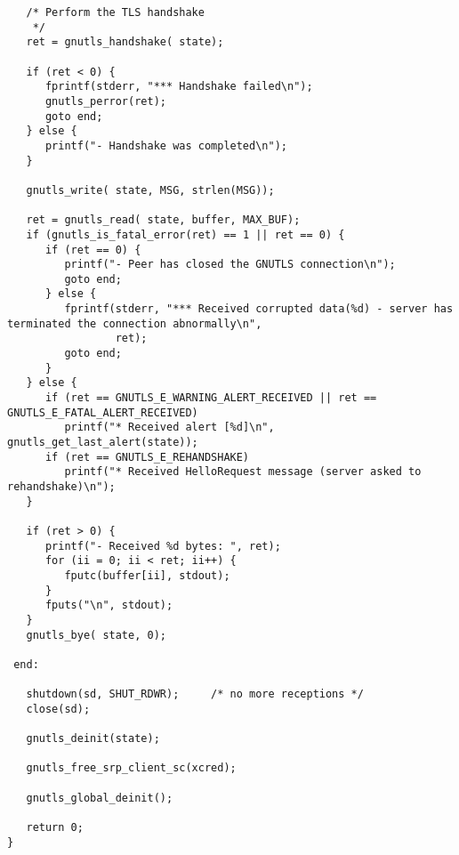 \begin{verbatim}
   /* Perform the TLS handshake
    */
   ret = gnutls_handshake( state);

   if (ret < 0) {
      fprintf(stderr, "*** Handshake failed\n");
      gnutls_perror(ret);
      goto end;
   } else {
      printf("- Handshake was completed\n");
   }

   gnutls_write( state, MSG, strlen(MSG));

   ret = gnutls_read( state, buffer, MAX_BUF);
   if (gnutls_is_fatal_error(ret) == 1 || ret == 0) {
      if (ret == 0) {
         printf("- Peer has closed the GNUTLS connection\n");
         goto end;
      } else {
         fprintf(stderr, "*** Received corrupted data(%d) - server has terminated the connection abnormally\n",
                 ret);
         goto end;
      }
   } else {
      if (ret == GNUTLS_E_WARNING_ALERT_RECEIVED || ret == GNUTLS_E_FATAL_ALERT_RECEIVED)
         printf("* Received alert [%d]\n", gnutls_get_last_alert(state));
      if (ret == GNUTLS_E_REHANDSHAKE)
         printf("* Received HelloRequest message (server asked to rehandshake)\n");
   }

   if (ret > 0) {
      printf("- Received %d bytes: ", ret);
      for (ii = 0; ii < ret; ii++) {
         fputc(buffer[ii], stdout);
      }
      fputs("\n", stdout);
   }
   gnutls_bye( state, 0);

 end:

   shutdown(sd, SHUT_RDWR);     /* no more receptions */
   close(sd);

   gnutls_deinit(state);

   gnutls_free_srp_client_sc(xcred);

   gnutls_global_deinit();

   return 0;
}

\end{verbatim}
